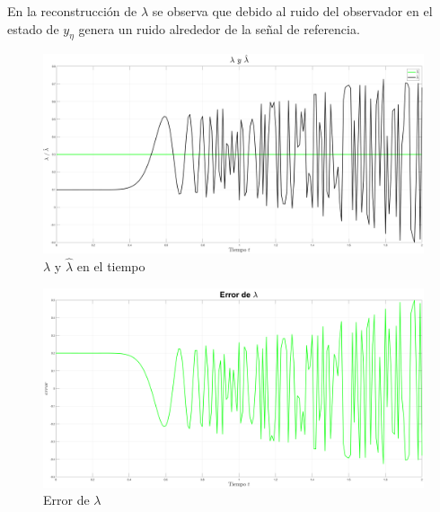 En la reconstrucción de $\lambda$ se observa que debido al ruido del observador en el estado de $y_\eta$ genera un ruido alrededor de la señal de referencia.

\begin{figure}[H]
	\centering
	\includegraphics[width=150mm]{img/E3_Lambda.png}
	\caption{$\lambda$ y $\hat{\lambda}$ en el tiempo}
	\label{img:rossler6}
\end{figure}

\begin{figure}[H]
	\centering
	\includegraphics[width=150mm]{img/E3_ErrorLambda.png}
	\caption{Error de $\lambda$}
	\label{img:rossler7}
\end{figure}